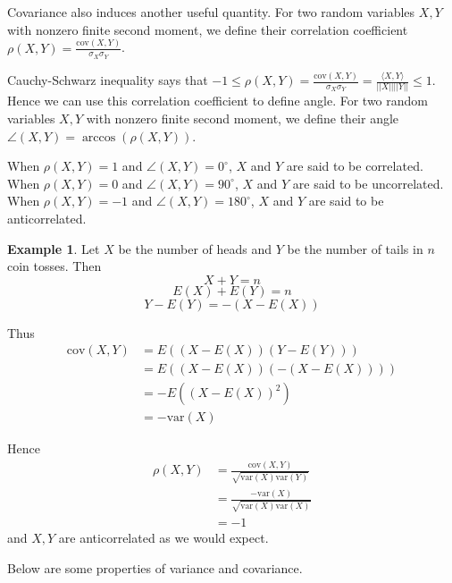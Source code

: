 \documentclass[12pt]{amsart}
\theoremstyle{definition}
\newtheorem{example}[theorem]{Example}
\begin{document}
Covariance also induces another useful quantity.
\dfn For two random variables $X, Y$ with nonzero finite second moment, we define their correlation coefficient $\rho(X, Y) = \frac{\text{cov}(X, Y)}{\sigma_X \sigma_Y}$.

Cauchy-Schwarz inequality says that $-1 \leq \rho(X, Y) = \frac{\text{cov}(X, Y)}{\sigma_X \sigma_Y} = \frac{\langle X, Y \rangle}{||X||||Y||} \leq 1$. Hence we can use this correlation coefficient to define angle.
\dfn For two random variables $X, Y$ with nonzero finite second moment, we define their angle $\angle(X, Y) = \arccos(\rho(X, Y))$.

When $\rho(X, Y) =  1$ and $\angle(X, Y) = 0^{\circ}$, $X$ and $Y$ are said to be correlated. When $\rho(X, Y) =  0$ and $\angle(X, Y) = 90^{\circ}$, $X$ and $Y$ are said to be uncorrelated. When $\rho(X, Y) =  -1$ and $\angle(X, Y) = 180^{\circ}$, $X$ and $Y$ are said to be anticorrelated.

\begin{example} Let $X$ be the number of heads and $Y$ be the number of tails in $n$ coin tosses. Then
$$X + Y = n$$
$$E(X) + E(Y) = n$$
$$Y - E(Y) = -(X - E(X))$$

Thus
\begin{align*}
\text{cov}(X, Y) & = E((X - E(X))(Y-E(Y))) \\
 & = E((X-E(X))(-(X-E(X)))) \\
 & = -E((X-E(X))^2) \\
 & = -\text{var}(X)
\end{align*}

Hence
\begin{align*}
\rho(X, Y) & = \frac{\text{cov}(X, Y)}{\sqrt{\text{var}(X) \text{var}(Y)}} \\
 & = \frac{-\text{var}(X)}{\sqrt{\text{var}(X) \text{var}(X)}} \\
 & = -1
\end{align*}
and $X, Y$ are anticorrelated as we would expect.
\end{example}

Below are some properties of variance and covariance.
\end{document}
